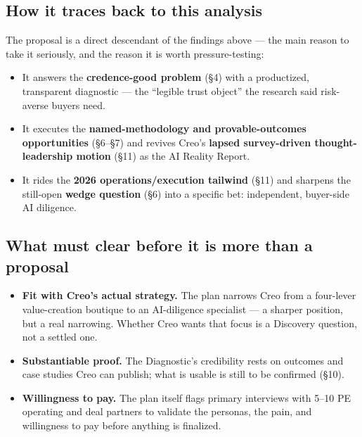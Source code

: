 \documentclass[11pt]{article}
\begin{document}
\subsection{How it traces back to this analysis}
The proposal is a direct descendant of the findings above --- the main reason to take it
seriously, and the reason it is worth pressure-testing:
\begin{itemize}
  \item It answers the \textbf{credence-good problem} (\S4) with a productized, transparent
  diagnostic --- the ``legible trust object'' the research said risk-averse buyers need.
  \item It executes the \textbf{named-methodology and provable-outcomes opportunities}
  (\S6--\S7) and revives Creo's \textbf{lapsed survey-driven thought-leadership motion}
  (\S11) as the AI Reality Report.
  \item It rides the \textbf{2026 operations/execution tailwind} (\S11) and sharpens the
  still-open \textbf{wedge question} (\S6) into a specific bet: independent, buyer-side AI
  diligence.
\end{itemize}

\subsection{What must clear before it is more than a proposal}
\begin{itemize}
  \item \textbf{Fit with Creo's actual strategy.} The plan narrows Creo from a four-lever
  value-creation boutique to an AI-diligence specialist --- a sharper position, but a real
  narrowing. Whether Creo wants that focus is a Discovery question, not a settled one.
  \item \textbf{Substantiable proof.} The Diagnostic's credibility rests on outcomes and case
  studies Creo can publish; what is usable is still to be confirmed (\S10).
  \item \textbf{Willingness to pay.} The plan itself flags primary interviews with 5--10 PE
  operating and deal partners to validate the personas, the pain, and willingness to pay
  before anything is finalized.
\end{itemize}

\end{document}
